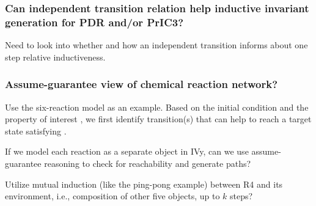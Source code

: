 \subsubsection*{Can independent transition relation help inductive
	invariant generation for PDR and/or PrIC3?} Need to look into
whether and how an independent transition informs about one step
relative inductiveness.

\subsubsection*{Assume-guarantee view of chemical reaction network?}
Use the six-reaction model as an example. Based on the initial
condition and the property of interest \targetSt, we first identify
transition(s) that can help to reach a target state satisfying
\targetSt. 

If we model each reaction as a separate object in IVy, can we use
assume-guarantee reasoning to check for reachability and generate paths?

Utilize mutual induction (like the ping-pong example) between R4 and
its environment, i.e., composition of other five objects, up to $k$
steps?

